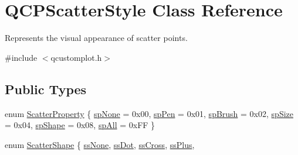 \hypertarget{class_q_c_p_scatter_style}{}\section{Q\+C\+P\+Scatter\+Style Class Reference}
\label{class_q_c_p_scatter_style}


Represents the visual appearance of scatter points.  




{\ttfamily \#include $<$qcustomplot.\+h$>$}

\subsection*{Public Types}
\begin{DoxyCompactItemize}
\item 
enum \mbox{\hyperlink{class_q_c_p_scatter_style_a8974f6a20f8f6eea7781f0e6af9deb46}{Scatter\+Property}} \{ \newline
\mbox{\hyperlink{class_q_c_p_scatter_style_a8974f6a20f8f6eea7781f0e6af9deb46a5891be10bea382fad6c20f7737a2dd90}{sp\+None}} = 0x00, 
\mbox{\hyperlink{class_q_c_p_scatter_style_a8974f6a20f8f6eea7781f0e6af9deb46aa04d012e7c03e455db2b68fdd55c2a04}{sp\+Pen}} = 0x01, 
\mbox{\hyperlink{class_q_c_p_scatter_style_a8974f6a20f8f6eea7781f0e6af9deb46af0499b1fc04de2dcc7e47ff0ef75c904}{sp\+Brush}} = 0x02, 
\mbox{\hyperlink{class_q_c_p_scatter_style_a8974f6a20f8f6eea7781f0e6af9deb46a553ae95798ace9a328c7cd62045260b0}{sp\+Size}} = 0x04, 
\newline
\mbox{\hyperlink{class_q_c_p_scatter_style_a8974f6a20f8f6eea7781f0e6af9deb46a19c224563adb42c55fb8b7ae6904411b}{sp\+Shape}} = 0x08, 
\mbox{\hyperlink{class_q_c_p_scatter_style_a8974f6a20f8f6eea7781f0e6af9deb46af62509c0409467f387234274762e6f69}{sp\+All}} = 0x\+FF
 \}
\item 
enum \mbox{\hyperlink{class_q_c_p_scatter_style_adb31525af6b680e6f1b7472e43859349}{Scatter\+Shape}} \{ \newline
\mbox{\hyperlink{class_q_c_p_scatter_style_adb31525af6b680e6f1b7472e43859349abd144c291ca274f77053ec68cab6c022}{ss\+None}}, 
\mbox{\hyperlink{class_q_c_p_scatter_style_adb31525af6b680e6f1b7472e43859349a06e15a735b79093a1d999c0374fa3aa1}{ss\+Dot}}, 
\mbox{\hyperlink{class_q_c_p_scatter_style_adb31525af6b680e6f1b7472e43859349a9eacd60f059dc3ef71bf249f515a6fe4}{ss\+Cross}}, 
\mbox{\hyperlink{class_q_c_p_scatter_style_adb31525af6b680e6f1b7472e43859349a2d7f1d3c1a148b9d9d17f2fd9cae5eb7}{ss\+Plus}}, 
\newline

\end{DoxyCompactItemize}

